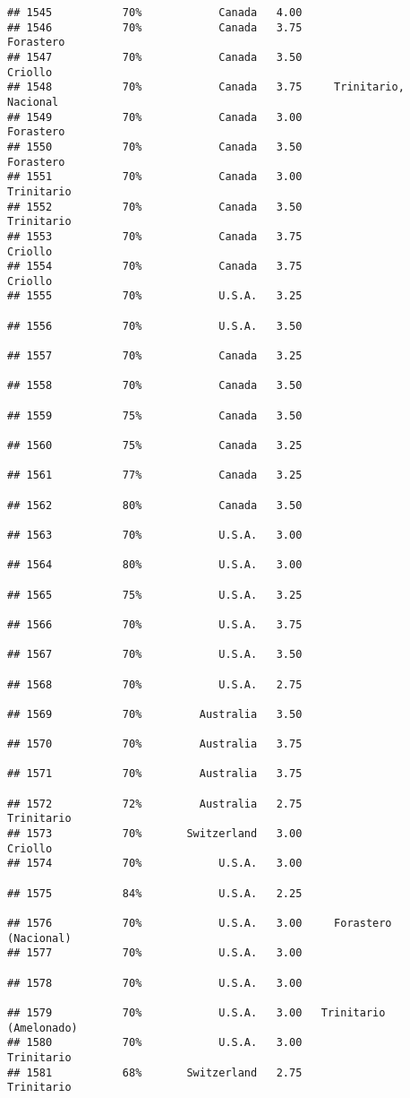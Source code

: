 \documentclass[
]{article}
\begin{document}
\begin{verbatim}
## 1545           70%            Canada   4.00                         
## 1546           70%            Canada   3.75                Forastero
## 1547           70%            Canada   3.50                  Criollo
## 1548           70%            Canada   3.75     Trinitario, Nacional
## 1549           70%            Canada   3.00                Forastero
## 1550           70%            Canada   3.50                Forastero
## 1551           70%            Canada   3.00               Trinitario
## 1552           70%            Canada   3.50               Trinitario
## 1553           70%            Canada   3.75                  Criollo
## 1554           70%            Canada   3.75                  Criollo
## 1555           70%            U.S.A.   3.25                         
## 1556           70%            U.S.A.   3.50                         
## 1557           70%            Canada   3.25                         
## 1558           70%            Canada   3.50                         
## 1559           75%            Canada   3.50                         
## 1560           75%            Canada   3.25                         
## 1561           77%            Canada   3.25                         
## 1562           80%            Canada   3.50                         
## 1563           70%            U.S.A.   3.00                         
## 1564           80%            U.S.A.   3.00                         
## 1565           75%            U.S.A.   3.25                         
## 1566           70%            U.S.A.   3.75                         
## 1567           70%            U.S.A.   3.50                         
## 1568           70%            U.S.A.   2.75                         
## 1569           70%         Australia   3.50                         
## 1570           70%         Australia   3.75                         
## 1571           70%         Australia   3.75                         
## 1572           72%         Australia   2.75               Trinitario
## 1573           70%       Switzerland   3.00                  Criollo
## 1574           70%            U.S.A.   3.00                         
## 1575           84%            U.S.A.   2.25                         
## 1576           70%            U.S.A.   3.00     Forastero (Nacional)
## 1577           70%            U.S.A.   3.00                         
## 1578           70%            U.S.A.   3.00                         
## 1579           70%            U.S.A.   3.00   Trinitario (Amelonado)
## 1580           70%            U.S.A.   3.00               Trinitario
## 1581           68%       Switzerland   2.75               Trinitario

\end{verbatim}
\end{document}
